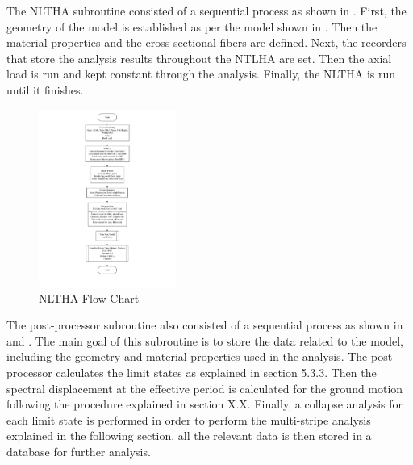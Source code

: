 The NLTHA subroutine consisted of a sequential process as shown in . First, the geometry of the model is established as per the model shown in . Then the material properties and the cross-sectional fibers are defined. Next, the recorders that store the analysis results throughout the NTLHA are set. Then the axial load is run and kept constant through the analysis. Finally, the NLTHA is run until it finishes.

\begin{figure}[htp]
	\centering
	\includegraphics[width=0.40\textwidth]{VAC Thesis 2.0/Chapter-5/figs/NLTHA_FlowCharts_01.pdf}
	\caption{NLTHA Flow-Chart}
	\label{fig:nltha_flowchart}
\end{figure}

The post-processor subroutine also consisted of a sequential process as shown in  and  . The main goal of this subroutine is to store the data related to the model, including the geometry and material properties used in the analysis. The post-processor calculates the limit states as explained in section 5.3.3. Then the spectral displacement at the effective period is calculated for the ground motion following the procedure explained in section X.X. Finally, a collapse analysis for each limit state is performed in order to perform the multi-stripe analysis explained in the following section, all the relevant data is then stored in a database for further analysis.

